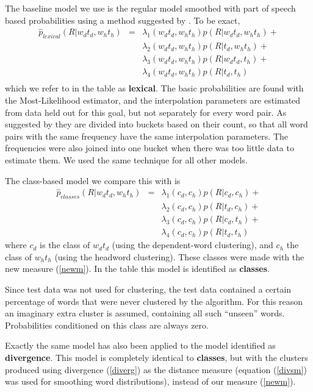 The baseline model we use is the regular model smoothed with part of
speech based probabilities using a method suggested by \cite{bahl83}. 
To be exact,
\begin{eqnarray*}
\hat{p}_{lexical}(R|w_{d}t_{d}, w_{h}t_{h}) 
 & = & \lambda_{1}(w_{d}t_{d}, w_{h}t_{h})p(R|w_{d}t_{d}, w_{h}t_{h}) + \\
      &  & \lambda_{2}(w_{d}t_{d}, w_{h}t_{h})p(R|t_{d}, w_{h}t_{h}) + \\
      &  & \lambda_{3}(w_{d}t_{d}, w_{h}t_{h})p(R|w_{d}t_{d}, t_{h}) + \\
      &  & \lambda_{4}(w_{d}t_{d}, w_{h}t_{h})p(R|t_{d}, t_{h}) \\
\end{eqnarray*}
which we refer to in the table as {\bf lexical}. The basic
probabilities are found with the Most-Likelihood estimator, and the
interpolation parameters are estimated from data held out for this
goal, but not separately for every word pair. As suggested by 
\cite{bahl83} they are divided into buckets based on 
their count, so that all
word pairs with the same frequency have the same interpolation
parameters. The frequencies were also joined into one bucket when
there was too little data to estimate them. We used the same technique
for all other models.

The class-based model we compare this with is
\begin{eqnarray*}
\hat{p}_{classes}(R|w_{d}t_{d}, w_{h}t_{h}) 
 & = & \lambda_{1}(c_{d}, c_{h})p(R|c_{d}, c_{h}) + \\
      &  & \lambda_{2}(c_{d}, c_{h})p(R|t_{d}, c_{h}) + \\
      &  & \lambda_{3}(c_{d}, c_{h})p(R|c_{d}, t_{h}) + \\
      &  & \lambda_{4}(c_{d}, c_{h})p(R|t_{d}, t_{h})
\end{eqnarray*}
where $c_{d}$ is the class of $w_{d}t_{d}$ (using the dependent-word
clustering), and $c_{h}$ the class of $w_{h}t_{h}$ (using the
headword clustering). These classes were made with the new 
measure (\ref{newm}). In the table this model is identified as {\bf classes}.

Since test data was not used for clustering, the test data contained a
certain percentage of words that were never clustered by the
algorithm. For this reason an imaginary extra cluster is assumed,
containing all such ``unseen'' words. Probabilities conditioned on
this class are always zero.

Exactly the same model has also been applied to the model identified
as {\bf divergence}. This model is completely identical to {\bf classes},
but with the clusters produced using divergence (\ref{diverg}) as the
distance measure (equation (\ref{divsm}) was used for smoothing word
distributions), instead of our measure (\ref{newm}).

